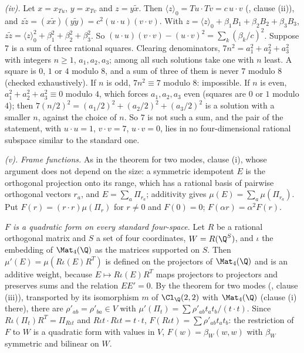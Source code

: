 \emph{(iv).} Let $x = x_{Tu}$, $y = x_{Tv}$ and $z = y\tilde{x}$. Then $\langle z\rangle_{0} = Tu \cdot Tv = c\,u \cdot v$ (, clause (ii)), and $z\tilde{z} = (x\tilde{x})(y\tilde{y}) = c^{2}(u \cdot u)(v \cdot v)$. With $z = \langle z\rangle_{0} + \beta_{1}B_{1} + \beta_{2}B_{2} + \beta_{3}B_{3}$, $z\tilde{z} = \langle z\rangle_{0}^{2} + \beta_{1}^{2} + \beta_{2}^{2} + \beta_{3}^{2}$. So $(u \cdot u)(v \cdot v) - (u \cdot v)^{2} = \sum_{k}(\beta_{k}/c)^{2}$. Suppose $7$ is a sum of three rational squares. Clearing denominators, $7n^{2} = a_{1}^{2} + a_{2}^{2} + a_{3}^{2}$ with integers $n \ge 1$, $a_{1}, a_{2}, a_{3}$; among all such solutions take one with $n$ least. A square is $0$, $1$ or $4$ modulo $8$, and a sum of three of them is never $7$ modulo $8$ (checked exhaustively). If $n$ is odd, $7n^{2} \equiv 7$ modulo $8$: impossible. If $n$ is even, $a_{1}^{2} + a_{2}^{2} + a_{3}^{2} \equiv 0$ modulo $4$, which forces $a_{1}, a_{2}, a_{3}$ even (squares are $0$ or $1$ modulo $4$); then $7(n/2)^{2} = (a_{1}/2)^{2} + (a_{2}/2)^{2} + (a_{3}/2)^{2}$ is a solution with a smaller $n$, against the choice of $n$. So $7$ is not such a sum, and the pair of the statement, with $u \cdot u = 1$, $v \cdot v = 7$, $u \cdot v = 0$, lies in no four-dimensional rational subspace similar to the standard one.

\emph{(v).} \emph{Frame functions.} As in the theorem for two modes, clause (i), whose argument does not depend on the size: a symmetric idempotent $E$ is the orthogonal projection onto its range, which has a rational basis of pairwise orthogonal vectors $r_{a}$, and $E = \sum_{a}\Pi_{r_{a}}$; additivity gives $\mu(E) = \sum_{a}\mu(\Pi_{r_{a}})$. Put $F(r) = (r \cdot r)\mu(\Pi_{r})$ for $r \ne 0$ and $F(0) = 0$; $F(\alpha r) = \alpha^{2}F(r)$.

\emph{$F$ is a quadratic form on every standard four-space.} Let $R$ be a rational orthogonal matrix and $S$ a set of four coordinates, $W = R(\Q^{S})$, and $\iota$ the embedding of $\Mat_{4}(\Q)$ as the matrices supported on $S$. Then $\mu'(E) = \mu(R\iota(E)R^{T})$ is defined on the projectors of $\Mat_{4}(\Q)$ and is an additive weight, because $E \mapsto R\iota(E)R^{T}$ maps projectors to projectors and preserves sums and the relation $EE' = 0$. By the theorem for two modes (, clause (iii)), transported by its isomorphism $m$ of $\Cl_{\Q}(2,2)$ with $\Mat_{4}(\Q)$ (clause (i) there), there are $\rho'_{ab} = \rho'_{ba} \in V$ with $\mu'(\Pi_{t}) = \sum\rho'_{ab}t_{a}t_{b}/(t \cdot t)$. Since $R\iota(\Pi_{t})R^{T} = \Pi_{R\iota t}$ and $R\iota t \cdot R\iota t = t \cdot t$, $F(R\iota t) = \sum\rho'_{ab}t_{a}t_{b}$: the restriction of $F$ to $W$ is a quadratic form with values in $V$, $F(w) = \beta_{W}(w,w)$ with $\beta_{W}$ symmetric and bilinear on $W$.

